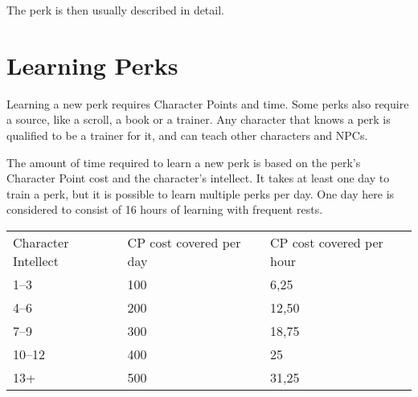 The perk is then usually described in detail.


\section{Learning Perks}
Learning a new perk requires Character Points and time.
Some perks also require a source, like a scroll, a book or a trainer.
Any character that knows a perk is qualified to be a trainer for it, and can teach other characters and NPCs.

The amount of time required to learn a new perk is based on the perk's Character Point cost and the character's intellect.
It takes at least one day to train a perk, but it is possible to learn multiple perks per day.
One day here is considered to consist of 16 hours of learning with frequent rests.\\

\begin{tabular}{l | l | l}
    Character Intellect & CP cost covered per day & CP cost covered per hour \\
    1--3                & 100                     & 6,25                     \\
    4--6                & 200                     & 12,50                    \\
    7--9                & 300                     & 18,75                    \\
    10--12              & 400                     & 25                       \\
    13+                 & 500                     & 31,25
\end{tabular}